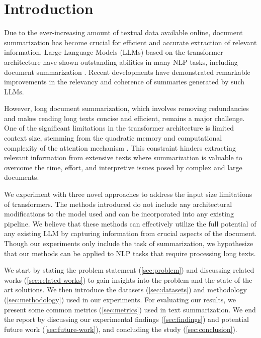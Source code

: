 \section{Introduction}
\label{sec:introduction}

Due to the ever-increasing amount of textual data available online, document summarization has become crucial for efficient and accurate extraction of relevant information.
Large Language Models (LLMs) based on the transformer architecture \cite{vaswani2017attention} have shown outstanding abilities in many NLP tasks, including document summarization \cite{yadav2023state}.
Recent developments have demonstrated remarkable improvements in the relevancy and coherence of summaries generated by such LLMs.

However, long document summarization, which involves removing redundancies and makes reading long texts concise and efficient, remains a major challenge.
One of the significant limitations in the transformer architecture is limited context size, stemming from the quadratic memory and computational complexity of the attention mechanism \cite{du2023improving}.
This constraint hinders extracting relevant information from extensive texts where summarization is valuable to overcome the time, effort, and interpretive issues posed by complex and large documents.

We experiment with three novel approaches to address the input size limitations of transformers.
The methods introduced do not include any architectural modifications to the model used and can be incorporated into any existing pipeline.
We believe that these methods can effectively utilize the full potential of any existing LLM by capturing information from crucial aspects of the document.
Though our experiments only include the task of summarization, we hypothesize that our methods can be applied to NLP tasks that require processing long texts.

We start by stating the problem statement (\autoref{sec:problem}) and discussing related works (\autoref{sec:related-works}) to gain insights into the problem and the state-of-the-art solutions.
We then introduce the datasets (\autoref{sec:datasets}) and methodology (\autoref{sec:methodology}) used in our experiments.
For evaluating our results, we present some common metrics (\autoref{sec:metrics}) used in text summarization.
We end the report by discussing our experimental findings (\autoref{sec:findings}) and potential future work (\autoref{sec:future-work}), and concluding the study (\autoref{sec:conclusion}).
